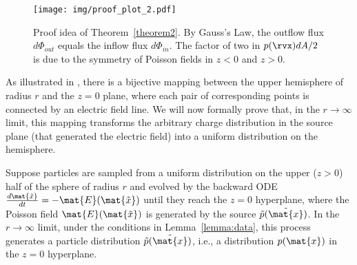 \begin{figure*}
    \centering
    \texttt{[image: img/proof\_plot\_2.pdf]}
    \caption{Proof idea of Theorem~\ref{theorem2}. By Gauss's Law, the outflow flux $d\Phi_{out}$ equals the inflow flux $d\Phi_{in}$. The factor of two in $p(\rvx)dA/2$ is due to the symmetry of Poisson fields in $z<0$ and $z>0$.
    }
        \label{fig:theorem2}
\end{figure*}

As illustrated in , there is a bijective mapping between the upper hemisphere of radius $r$ and the $z=0$ plane, where each pair of corresponding points is connected by an electric field line. 
We will now formally prove that, in the $r\to\infty$ limit, this mapping transforms the arbitrary charge distribution in the source plane (that generated the electric field) into a uniform distribution on the hemisphere. 
\begin{theorem}
\label{theorem2}
 {Suppose particles are sampled from a uniform distribution on the upper ($z>0$) half of the sphere of radius $r$ and evolved by the backward ODE $\frac{d\mat{\tilde{x}}}{dt}=-\mat{E}(\mat{\tilde{x}})$ until they reach the $z=0$ hyperplane, where the Poisson field $\mat{E}(\mat{\tilde{x}})$ is generated by the source $\tilde{p}(\tilde{\mat{x}})$. In the $r\to \infty$ limit, {under the conditions in Lemma~\ref{lemma:data}}, this process generates a particle distribution $\tilde{p}(\tilde{\mat{x}})$, 
i.e., a distribution $p(\mat{x})$ in the $z=0$ hyperplane.} 
\end{theorem}

